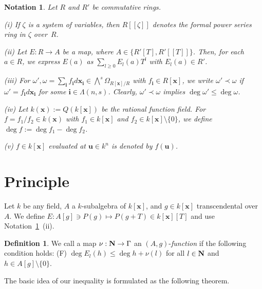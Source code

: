 \documentclass{amsart}
\theoremstyle{plain}
\newtheorem{notation}{Notation}
\theoremstyle{definition}
\newtheorem{definition}[thm]{Definition}
\newcommand{\zs}{\{ 0\} }
\newcommand{\sm}{\setminus}
\newcommand{\nd}{\noindent}
\newcommand{\N}{{\bf N}}
\newcommand{\x}{{\boldsymbol x}}
\newcommand{\bi}{{\boldsymbol i}}
\newcommand{\bu}{{\boldsymbol u}}
\newcommand{\kx}{k[\x]}
\newcommand{\kxr}{k(\x)}
\newcommand{\Rx}{R[\x]}
\newcommand{\degw  }{\deg}
\begin{document}
\begin{notation}\label{notation:E_l}\rm 
Let $R$ and $R'$ be commutative rings. 



\nd (i) 
If $\zeta $ is a system of variables, 
then $R[[\zeta ]]$ denotes 
the formal power series ring in $\zeta $ over~$R$. 



\nd (ii) 
Let $E:R\to A$ be a map, 
where $A\in \{ R'[T],R'[[T]]\} $. 
Then, for each $a\in R$, 
we express $E(a)$ as $\sum _{l\ge 0}E_l(a)T^l$ with $E_l(a)\in R'$. 


\nd (iii) 
For $\omega ',\omega =\sum _{\bi }f_{\bi }d\x _{\bi }
\in \bigwedge ^s\Omega _{\Rx /R}$ 
with $f_{\bi }\in \Rx $, 
we write $\omega '\prec \omega $ if 
$\omega '=f_{\bi }d\x _{\bi }$ for some $\bi \in \Lambda (n,s)$. 
Clearly, 
$\omega '\prec \omega $ implies  
$\degw  \omega '\le \degw \omega $. 


\nd (iv) 
Let $\kxr :=Q(\kx )$ be the rational function field. 
For $f=f_1/f_2\in \kxr $ 
with $f_1\in \kx $ and $f_2\in \kx \sm \zs $, 
we define $\degw  f:=\degw  f_1-\degw  f_2$. 



\nd (v) 
$f\in \kx $ evaluated at $\bu \in k^n$ is denoted by $f(\bu )$. 
\end{notation}




\section{Principle}\label{sect:principle}
\setcounter{equation}{0}



Let $k$ be any field, 
$A$ a $k$-subalgebra of $\kx $, 
and $g\in \kx $ transcendental over $A$. 
We define $E:A[g]\ni P(g)\mapsto P(g+T)\in \kx [T]$ 	
and use Notation~\ref{notation:E_l}~(ii). 


\begin{definition}\label{def:(A,g)-function}\rm 
We call a map $\nu :\N \to \Gamma $ an 
$(A,g)$-{\it function} if the following condition holds: 
\nd (F) $\degw E_l(h)\le \degw h+\nu (l)$ 
for all $l\in \N $ and $h\in A[g]\sm \zs $. 
\end{definition}


The basic idea of our inequality 
is formulated as the following theorem.
\end{document}
